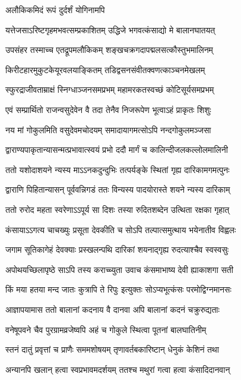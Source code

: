\onelineshloka
{अलौकिकमिदं रूपं दुर्दर्शं योगिनामपि}%

\twolineshloka
{यत्तेजसाऽरिष्टगृहमभवत्सम्प्रकाशितम्}
{उद्धिजे भगवत्कंसाद्यो मे बालानघातयत्}%

\twolineshloka
{उपसंहर तस्माच्च एतद्रूपमलौकिकम्}
{शङ्खचक्रगदापद्मलसत्कौस्तुभमालिनम्}%

\twolineshloka
{किरीटहारमुकुटकेयूरवलयाङ्कितम्}
{तडिद्वसनसंवीतक्वणत्काञ्चनमेखलम्}%

\twolineshloka
{स्फुरद्राजीवताम्राक्षं स्निग्धाञ्जनसमप्रभम्}
{महामरकतस्वच्छं कोटिसूर्यसमप्रभम्}%

\twolineshloka
{एवं सम्प्रार्थितो राजन्वसुदेवेन वै तदा}
{तेनैव निजरूपेण भूत्वाऽहं प्राकृतः शिशुः}%

\twolineshloka
{नय मां गोकुलमिति वसुदेवमचोदयम्}
{समादायागमत्सोऽपि नन्दगोकुलमञ्जसा}%

\twolineshloka
{द्वाराण्यपाकृतान्यासन्मत्प्रभावात्स्वयं प्रभो}
{ददौ मार्गं च कालिन्दीजलकल्लोलमालिनी}%

\twolineshloka
{ततो यशोदाशयने न्यस्य माऽऽनकदुन्दुभिः}
{तत्पर्यङ्के स्थितां गृह्य दारिकामगमत्पुनः}%

\twolineshloka
{द्वाराणि पिहितान्यासन् पूर्ववन्निगडं ततः}
{विन्यस्य पादयोरास्ते शयने न्यस्य दारिकाम्}%

\twolineshloka
{ततो रुरोद महता स्वरेणाऽऽपूर्य सा दिशः}
{तस्या रुदितशब्देन उत्थिता रक्षका गृहात्}%

\twolineshloka
{कंसायाऽऽगत्य चाचख्युः प्रसूता देवकीति च}
{सोऽपि तल्पात्समुत्थाय भयेनातीव विह्वलः}%

\twolineshloka
{जगाम सूतिकागेहं देवक्याः प्रस्खलन्पथि}
{दारिकां शयनाद्गृह्य रुदत्याश्चैव स्वस्वसुः}%

\twolineshloka
{अपोथयच्छिलापृष्ठे साऽपि तस्य कराच्च्युता}
{उवाच कंसमाभाष्य देवी ह्याकाशगा सती}%

\twolineshloka
{किं मया हतया मन्द जातः कुत्रापि ते रिपुः}
{इत्युक्तः सोऽप्यभूत्कंसः परमोद्विग्नमानसः}%

\twolineshloka
{आज्ञापयामास ततो बालानां कदनाय वै}
{दानवा अपि बालानां कदनं चक्रुरुद्यताः}%

\twolineshloka
{वनेषूपवने चैव पुरग्रामव्रजेष्वपि}
{अहं च गोकुले स्थित्वा पूतनां बालघातिनीम्}%

\twolineshloka
{स्तनं दातुं प्रवृत्तां च प्राणैः सममशोषयम्}
{तृणावर्तबकारिष्टान् धेनुकं केशिनं तथा}%

\twolineshloka
{अन्यानपि खलान् हत्वा स्वप्रभावमदर्शयम्}
{ततश्च मथुरां गत्वा हत्वा कंसादिदानवान्}%

